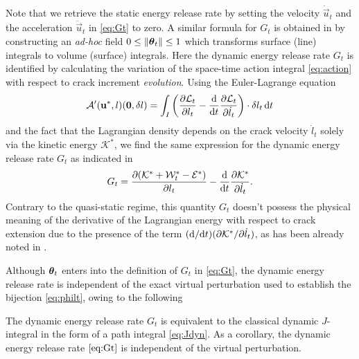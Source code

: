 Note that we retrieve the static energy release rate \cite{Destuynder:1981} by setting the velocity $\dot{\vec{u}}_t$ and the acceleration $\ddot{\vec{u}}_t$ in \eqref{eq:Gt} to zero. A similar formula for $G_t$ is obtained in \cite{AttiguiPetit:1996} by constructing an \emph{ad-hoc} field $0\leq\norm{\vtheta_t}\leq 1$ which transforms surface (line) integrals to volume (surface) integrals. Here the dynamic energy release rate $G_t$ is identified by calculating the variation of the space-time action integral \eqref{eq:action} with respect to crack increment \emph{evolution}. Using the Euler-Lagrange equation 
\[
\mathcal{A}'(\vec{u}^*,l)(\vec{0},\delta l)=\int_I\left(\frac{\partial\mathcal{L}_t}{\partial l_t}-\frac{\md}{\md t}\frac{\partial\mathcal{L}_t}{\partial\dot{l}_t}\right)\cdot\delta l_t\D{t}
\]
and the fact that the Lagrangian density depends on the crack velocity $\dot{l}_t$ solely via the kinetic energy $\mathcal{K}^*$, we find the same expression for the dynamic energy release rate $G_t$ as indicated in \cite[p.~423]{Freund:1990}
\[
G_t=\frac{\partial(\mathcal{K}^*+\mathcal{W}_t^*-\mathcal{E}^*)}{\partial l_t}-\frac{\mathrm{d}}{\mathrm{d} t}\frac{\partial\mathcal{K}^*}{\partial\dot{l}_t}.
\]
Contrary to the quasi-static regime, this quantity $G_t$ doesn't possess the physical meaning of the derivative of the Lagrangian energy with respect to crack extension due to the presence of the term $(\mathrm{d}/\mathrm{d} t)(\partial\mathcal{K}^*/\partial\dot{l}_t)$, as has been already noted in \cite{NishiokaAtluri:1983}.

Although $\vtheta_t$ enters into the definition of $G_t$ in \eqref{eq:Gt}, the dynamic energy release rate is independent of the exact virtual perturbation used to establish the bijection \eqref{eq:philt}, owing to the following
\begin{proposition} \label{prop:J}
The dynamic energy release rate $G_t$ is equivalent to the classical dynamic $J$-integral in the form of a path integral \eqref{eq:Jdyn}. As a corollary, the dynamic energy release rate $\eqref{eq:Gt}$ is independent of the virtual perturbation.
\end{proposition}

